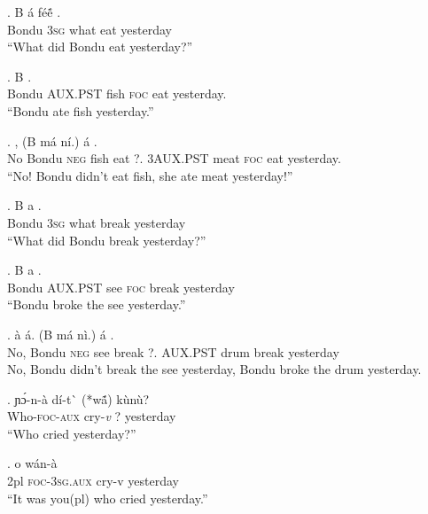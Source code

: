 \documentclass{assets/fieldnotes}
\begin{document}
\exg. B \'a f\'e\'{\~e}  .\\
Bondu \textsc{3sg} what eat yesterday\\
``What did Bondu eat yesterday?''

\exg. B     .\\
Bondu \textsc{AUX.PST} fish \textsc{foc} eat yesterday.\\
``Bondu ate fish yesterday.''

\exg. , (B m\'a   n\'i.) \'a    .\\ 
No Bondu \textsc{neg} fish eat ?. 3\textsc{AUX.PST} meat \textsc{foc} eat yesterday.\\
``No! Bondu didn't eat fish, she ate meat yesterday!''


\exg. B a   .\\
Bondu \textsc{3sg} what break yesterday\\
``What did Bondu break yesterday?''

\exg. B a    .\\
Bondu \textsc{AUX.PST} see \textsc{foc} break yesterday\\
``Bondu broke the see yesterday.''

\exg. \`a \'a. (B m\'a   n\`i.) \'a   .\\
No, Bondu \textsc{neg} see break ?. \textsc{AUX.PST} drum break yesterday\\
No, Bondu didn't break the see yesterday, Bondu broke the drum yesterday.


\exg. ɲɔ́-n-à dí-t\`{} (*wã́) kùnù?\\
Who-\textsc{foc-aux} cry-\textit{v} ? yesterday\\
``Who cried yesterday?''

\exg. o wán-à  \\
2pl \textsc{foc-3sg.aux} cry-v yesterday\\
``It was you(pl) who cried yesterday.''
\end{document}

